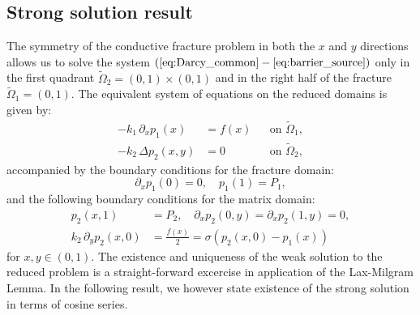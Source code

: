 \documentclass[sn-mathphys,Numbered]{sn-jnl}
\def\Laplace{\Delta}
\def\prtl{\partial} %
\begin{document}
\subsection{Strong solution result}
\label{sec:main_result_cf}
The symmetry of the conductive fracture problem in both the $x$ and $y$ directions allows us to solve the system $(\ref{eq:Darcy_common} - \ref{eq:barrier_source})$ only in the first quadrant $\widetilde\Omega_2=(0,1)\times(0,1)$ and in the right half of the fracture $\widetilde\Omega_1=(0,1)$. The equivalent system of equations on the reduced domains is given by:
\begin{align}
    \label{eq:cc_darcy_2d}
    -k_1\, \partial_x p_1(x) &= f(x)               &&\text{on }\widetilde\Omega_1,\\
    -k_2\, \Laplace p_2(x,y) &= 0         &&\text{on }\widetilde\Omega_2,
    \label{eq:cc_darcy_1d}
\end{align}
accompanied by the boundary conditions for the fracture domain:\begin{equation}
    \label{eq:cc_bc_1}
    \partial_x p_1(0) = 0, \quad  p_1(1) = P_1, 
\end{equation}
and the following boundary conditions for the matrix domain:
\begin{align}
    \label{eq:cc_bc_x}
    p_2(x, 1) &= P_2, \quad
    \prtl_x p_2(0,y) = \prtl_x p_2(1,y) = 0,\\    
    \label{eq:cc_bc_robin}
    k_2\, \prtl_y p_2(x,0) &= \frac{f(x)}{2}
                        = \sigma(p_2(x,0) - p_1(x))
\end{align}
for $x, y\in (0,1)$.
%
\newcommand{\kfrel}{\kappa_1}
\newcommand{\kmrel}{\kappa_2}
The existence and uniqueness of the weak solution to the reduced problem is a straight-forward excercise in application of the Lax-Milgram Lemma. In the following result, we however state existence of the strong solution in terms of cosine series.
\end{document}
